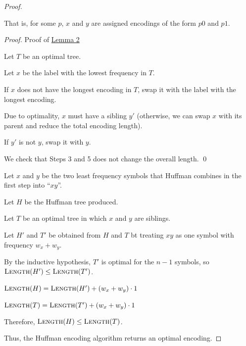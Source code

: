 \begin{proof}
\begin{listu}
\begin{lemma*}[2]
            That is, for some $p$, $x$ and $y$ are assigned encodings of the form $p0$ and $p1$.
        \end{lemma*}

        \textit{Proof.}
            Proof of \hyperref[lem:huffman-2]{Lemma 2}

            \begin{listo}
                \item Let $T$ be an optimal tree.
                \item Let $x$ be the label with the lowest frequency in $T$.
                \item If $x$ does not have the longest encoding in $T$, swap it with the label with the longest encoding.
                \item Due to optimality, $x$ must have a sibling $y'$ (otherwise, we can swap $x$ with its parent and reduce the total encoding length).
                \item If $y'$ is not $y$, swap it with $y$.
                \item We check that Steps 3 and 5 does not change the overall length. \qed
            \end{listo}

        Let $x$ and $y$ be the two least frequency symbols that Huffman combines in the first step into ``$xy$''.

        Let $H$ be the Huffman tree produced. 

        Let $T$ be an optimal tree in which $x$ and $y$ are siblings.

        Let $H'$ and $T'$ be obtained from $H$ and $T$ bt treating $xy$ as one symbol with frequency $w_x + w_y$.

        By the inductive hypothesis, $T'$ is optimal for the $n - 1$ symbols, so $\textsc{Length}(H') \le \textsc{Length}(T')$.

        \begin{listu}
            \item $\textsc{Length}(H) = \textsc{Length}(H') + (w_x + w_y) \cdot 1$
            \item $\textsc{Length}(T) = \textsc{Length}(T') + (w_x + w_y) \cdot 1$
        \end{listu}

        Therefore, $\textsc{Length}(H) \le \textsc{Length}(T)$.
    \end{listu}

    Thus, the Huffman encoding algorithm returns an optimal encoding.
\end{proof}

